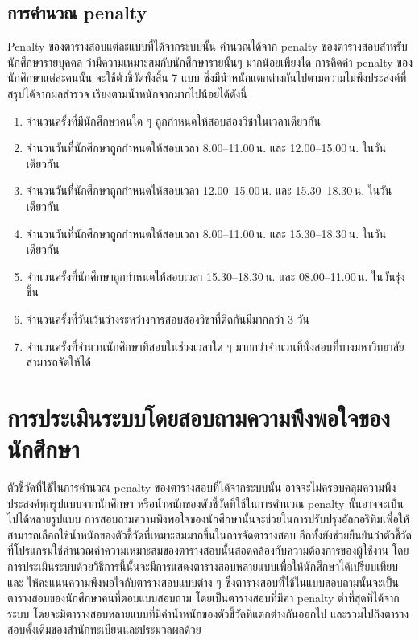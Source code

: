 \subsection{การคำนวณ penalty}
Penalty ของตารางสอบแต่ละแบบที่ได้จากระบบนั้น คำนวณได้จาก penalty ของตารางสอบสำหรับนักศึกษารายบุคคล ว่ามีความเหมาะสมกับนักศึกษารายนั้นๆ มากน้อยเพียงใด \enskip 
การคิดค่า penalty ของนักศึกษาแต่ละคนนั้น จะใช้ตัวชี้วัดทั้งสิ้น 7 แบบ ซึ่งมีน้ำหนักแตกต่างกันไปตามความไม่พึงประสงค์ที่สรุปได้จากผลสำรวจ เรียงตามน้ำหนักจากมากไปน้อยได้ดังนี้
\begin{enumerate}
    \item จำนวนครั้งที่มีนักศึกษาคนใด ๆ ถูกกำหนดให้สอบสองวิชาในเวลาเดียวกัน
    \item จำนวนวันที่นักศึกษาถูกกำหนดให้สอบเวลา 8.00--11.00\,น. และ 12.00--15.00\,น. ในวันเดียวกัน
    \item จำนวนวันที่นักศึกษาถูกกำหนดให้สอบเวลา 12.00--15.00\,น. และ 15.30--18.30\,น. ในวันเดียวกัน
    \item จำนวนวันที่นักศึกษาถูกกำหนดให้สอบเวลา 8.00--11.00\,น. และ 15.30--18.30\,น. ในวันเดียวกัน
    \item จำนวนครั้งที่นักศึกษาถูกกำหนดให้สอบเวลา 15.30--18.30\,น. และ 08.00--11.00\,น. ในวันรุ่งขึ้น
    \item จำนวนครั้งที่วันเว้นว่างระหว่างการสอบสองวิชาที่ติดกันมีมากกว่า 3 วัน
    \item จํานวนครั้งที่จำนวนนักศึกษาที่สอบในช่วงเวลาใด ๆ มากกว่าจํานวนที่นั่งสอบที่ทางมหาวิทยาลัยสามารถจัดให้ได้
\end{enumerate}

\section{การประเมินระบบโดยสอบถามความพึงพอใจของนักศึกษา}
ตัวชี้วัดที่ใช้ในการคำนวณ penalty ของตารางสอบที่ได้จากระบบนั้น อาจจะไม่ครอบคลุมความพึงประสงค์ทุกรูปแบบจากนักศึกษา หรือน้ำหนักของตัวชี้วัดที่ใช้ในการคำนวณ penalty นั้นอาจจะเป็นไปได้หลายรูปแบบ
\enskip การสอบถามความพึงพอใจของนักศึกษานั้นจะช่วยในการปรับปรุงอัลกอริทึมเพื่อให้สามารถเลือกใช้น้ำหนักของตัวชี้วัดที่เหมาะสมมากขึ้นในการจัดตารางสอบ
อีกทั้งยังช่วยยืนยันว่าตัวชี้วัดที่โปรแกรมใช้คํานวณค่าความเหมาะสมของตารางสอบนั้นสอดคล้องกับความต้องการของผู้ใช้งาน 
\enskip โดยการประเมินระบบด้วยวิธีการนี้นั้นจะมีการแสดงตารางสอบหลายแบบเพื่อให้นักศึกษาได้เปรียบเทียบและ
ให้คะแนนความพึงพอใจกับตารางสอบแบบต่าง ๆ ซึ่งตารางสอบที่ใช้ในแบบสอบถามนั้นจะเป็นตารางสอบของนักศึกษาคนที่ตอบแบบสอบถาม 
โดยเป็นตารางสอบที่มีค่า penalty ต่ำที่สุดที่ได้จากระบบ โดยจะมีตารางสอบหลายแบบที่มีค่าน้ำหนักของตัวชี้วัดที่แตกต่างกันออกไป 
และรวมไปถึงตารางสอบดั้งเดิมของสำนักทะเบียนและประมวลผลด้วย
